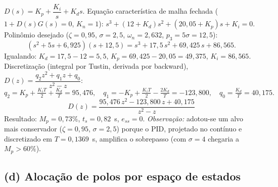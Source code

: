 \documentclass[11pt,a4paper]{article}
\begin{document}
$D(s)=K_p+\dfrac{K_i}{s}+K_d s$. Equa\c{c}\~ao caracter\'istica de malha fechada
($1+D(s)G(s)=0$, $K_n=1$): $s^3+(12+K_d)s^2+(20{,}05+K_p)s+K_i=0$.
Polin\^omio desejado ($\zeta=0{,}95$, $\sigma=2{,}5$, $\omega_n=2{,}632$, $p_3=5\sigma=12{,}5$):
\begin{equation}
(s^2+5s+6{,}925)(s+12{,}5)=s^3+17{,}5\,s^2+69{,}425\,s+86{,}565 .
\end{equation}
Igualando: $K_d=17{,}5-12=5{,}5$, $K_p=69{,}425-20{,}05=49{,}375$, $K_i=86{,}565$.
Discretiza\c{c}\~ao (integral por Tustin, derivada por backward), $D(z)=\dfrac{q_2z^2+q_1z+q_0}{z^2-z}$:
\begin{equation}
q_2=K_p+\tfrac{K_iT}{2}+\tfrac{K_d}{T}=95{,}476,\quad
q_1=-K_p+\tfrac{K_iT}{2}-\tfrac{2K_d}{T}=-123{,}800,\quad
q_0=\tfrac{K_d}{T}=40{,}175 .
\end{equation}
\begin{equation}
\boxed{\,D(z)=\dfrac{95{,}476\,z^2-123{,}800\,z+40{,}175}{z^2-z}\,}
\end{equation}
Resultado: $M_p=0{,}73\%$, $t_s=0{,}82$~s, $e_{ss}=0$. \emph{Observa\c{c}\~ao:} adotou-se um alvo
mais conservador ($\zeta=0{,}95$, $\sigma=2{,}5$) porque o PID, projetado no cont\'inuo e
discretizado em $T=0{,}1369$~s, amplifica o sobrepasso (com $\sigma=4$ chegaria a $M_p>60\%$).

\subsection{(d) Aloca\c{c}\~ao de polos por espa\c{c}o de estados}
\end{document}
